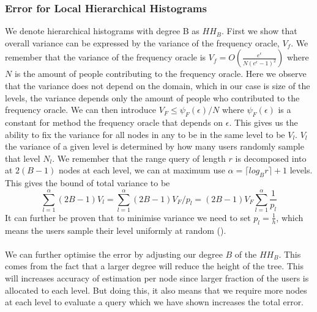 \documentclass[11pt]{article}
\theoremstyle{definition}
\begin{document}
\subsubsection{Error for Local Hierarchical Histograms}
We denote hierarchical histograms with degree B as $HH_B$. First we show that overall variance can be expressed by the variance of the frequency oracle, $V_f$.  We remember that the variance of the frequency oracle is $V_f= O\left(\frac{e^{\epsilon}}{N\left(e^{\epsilon}-1\right)^{2}}\right)$ where $N$ is the amount of people contributing to the frequency oracle. Here we observe that the variance does not depend on the domain, which in our case is size of the levels, the variance depends only the amount of people who contributed to the frequency oracle. We can then introduce $V_F\leq\psi_F(\epsilon)/N$ where $\psi_F(\epsilon)$ is a constant for method the frequency oracle that depends on $\epsilon$. This gives us the ability to fix the variance for all nodes in any to be in the same level to be $V_l$. $V_l$ the variance of a given level is determined by how many users randomly sample that level $N_l$. We remember that the range query of length $r$ is decomposed into at $2(B-1)$ nodes at each level, we can at maximum use $\alpha=\lceil log_B r\rceil+1$ levels. This gives the bound of total variance to be \[\sum_{l=1}^{\alpha}(2 B-1) V_{l}=\sum_{l=1}^{\alpha}(2 B-1) V_{F} / p_{l}=(2 B-1) V_{F} \sum_{l=1}^{\alpha} \frac{1}{p_{l}}\]
It can further be proven that to minimise variance we need to set $p_{l}=\frac{1}{h}$, which means the users sample their level uniformly at random (\cite[5]{local}). \\ \\

\noindent We can further optimise the error by adjusting our degree $B$ of the $HH_B$. This comes from the fact that a larger degree will reduce the height of the tree. This will increases accuracy of estimation per node since larger fraction of the users is allocated to each level. But doing this, it also means that we require more nodes at each level to evaluate a query which we have shown increases the total error. 
\end{document}
